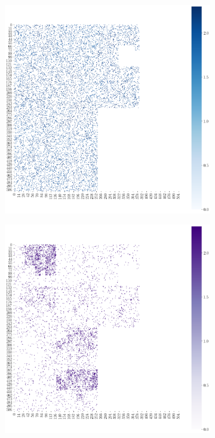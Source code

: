 \documentclass{article}
\begin{document}
\begin{figure}[htbp]
  \centering
  \begin{subfigure}[b]{.49\linewidth}
    \centering
    \includegraphics[width=\linewidth]{figures/random_hilbert.png}
    \caption{}
  \end{subfigure}
  \hfill
  \begin{subfigure}[b]{.49\linewidth}
    \centering
    \includegraphics[width=\linewidth]{figures/cbas_hilbert.png}

\end{subfigure}
\end{figure}
\end{document}
